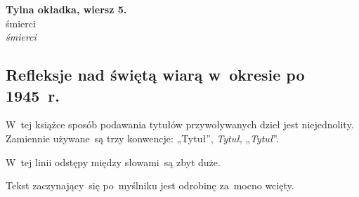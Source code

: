 \documentclass[a4paper,11pt]{article}
\begin{document}
\vspace{\spaceTwo}


\noindent
\textbf{Tylna okładka, wiersz 5.} \\
\Jest  śmierci \\
\Powin \textit{śmierci} \\











\newpage

\subsection{Refleksje nad świętą wiarą w~okresie po 1945~r.}

\vspace{\spaceThree}



{}

\vspace{0em}



\vspace{0em}


\noindent
W~tej książce sposób podawania tytułów przywoływanych dzieł
jest niejednolity. Zamiennie używane~są trzy konwencje: „Tytuł”,
\textit{Tytuł}, „\textit{Tytuł}”.

\vspace{\spaceFour}





\noindent
{} W~tej linii odstępy między słowami~są zbyt duże.

\vspace{\spaceFour}





\noindent
{} Tekst zaczynający~się po~myślniku jest odrobinę za~mocno
wcięty.

\vspace{\spaceFour}
\end{document}
